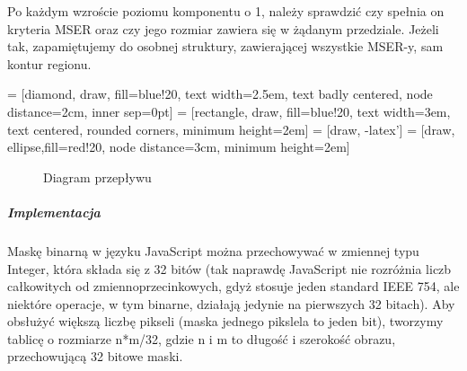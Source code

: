 Po każdym wzroście poziomu komponentu o 1, należy sprawdzić czy spełnia on
kryteria MSER oraz czy jego rozmiar zawiera się w żądanym przedziale. Jeżeli
tak, zapamiętujemy do osobnej struktury, zawierającej wszystkie MSER-y, sam
kontur regionu.

 = [diamond, draw, fill=blue!20,
text width=2.5em, text badly centered, node distance=2cm, inner sep=0pt]
 = [rectangle, draw, fill=blue!20,
text width=3em, text centered, rounded corners, minimum height=2em]
 = [draw, -latex']
 = [draw, ellipse,fill=red!20, node distance=3cm,
minimum height=2em]

\bigskip
\begin{figure}
\centering
{}
  \caption{Diagram przepływu}
\end{figure}

\subparagraph{Implementacja}

Maskę binarną w języku JavaScript można przechowywać w zmiennej typu Integer,
która składa się z 32 bitów (tak naprawdę JavaScript nie rozróżnia liczb
całkowitych od zmiennoprzecinkowych, gdyż stosuje jeden standard IEEE 754, ale
niektóre operacje, w tym binarne, działają jedynie na pierwszych 32 bitach).
Aby obsłużyć większą liczbę pikseli (maska jednego pikslela to jeden bit),
tworzymy tablicę o rozmiarze n*m/32, gdzie n i m to długość i szerokość obrazu,
przechowującą 32 bitowe maski.

